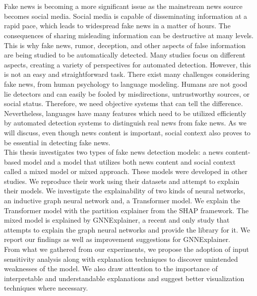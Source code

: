 \chapter{\abstractname}


Fake news is becoming a more significant issue as the mainstream news source becomes social media. Social media is capable of disseminating information at a rapid pace, which leads to widespread fake news in a matter of hours. The consequences of sharing misleading information can be destructive at many levels. This is why fake news, rumor, deception, and other aspects of false information are being studied to be automatically detected. Many studies focus on different aspects, creating a variety of perspectives for automated detection. However, this is not an easy and straightforward task. There exist many challenges considering fake news, from human psychology to language modeling. Humans are not good lie detectors and can easily be fooled by misdirections, untrustworthy sources, or social status. Therefore, we need objective systems that can tell the difference.\\
Nevertheless, languages have many features which need to be utilized efficiently by automated detection systems to distinguish real news from fake news. As we will discuss, even though news content is important, social context also proves to be essential in detecting fake news.\\
This thesis investigates two types of fake news detection models: a news content-based model and a model that utilizes both news content and social context called a mixed model or mixed approach.  These models were developed in other studies. We reproduce their work using their datasets and attempt to explain their models. We investigate the explainability of two kinds of neural networks, an inductive graph neural network and, a Transformer model. We explain the Transformer model with the partition explainer from the SHAP framework. The mixed model is explained by GNNExplainer, a recent and only study that attempts to explain the graph neural networks and provide the library for it. We report our findings as well as improvement suggestions for GNNExplainer.\\
From what we gathered from our experiments, we propose the adoption of input sensitivity analysis along with explanation techniques to discover unintended weaknesses of  the model. We also draw attention to the importance of interpretable and understandable explanations and suggest better visualization techniques where necessary.
